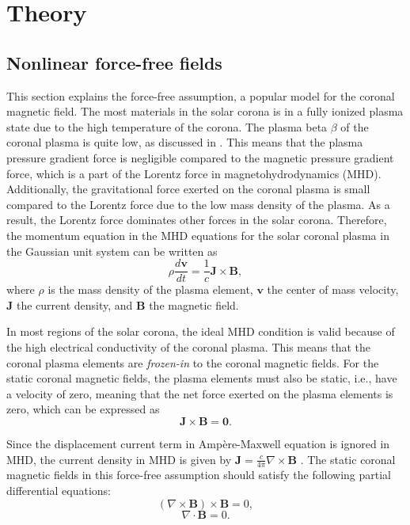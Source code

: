 
\section{Theory}

\subsection{Nonlinear force-free fields}\label{sec:nlfff}
This section explains the force-free assumption, a popular model for the coronal magnetic field. The most materials in the solar corona is in a fully ionized plasma state due to the high temperature of the corona. The plasma beta $\beta$ of the coronal plasma is quite low, as discussed in \parencite{gary2001plasma}. This means that the plasma pressure gradient force is negligible compared to the magnetic pressure gradient force, which is a part of the Lorentz force in magnetohydrodynamics (MHD). Additionally, the gravitational force exerted on the coronal plasma is small compared to the Lorentz force due to the low mass density of the plasma. As a result, the Lorentz force dominates other forces in the solar corona. Therefore, the momentum equation in the MHD equations for the solar coronal plasma in the Gaussian unit system can be written as
\begin{equation*}
    \rho \frac{d\boldsymbol{v}}{dt} = \frac{1}{c}\mathbf{J}\times\mathbf{B},
\end{equation*}
where $\rho$ is the mass density of the plasma element, $\boldsymbol{v}$ the center of mass velocity, $\mathbf{J}$ the current density, and $\mathbf{B}$ the magnetic field. 

In most regions of the solar corona, the ideal MHD condition is valid because of the high electrical conductivity of the coronal plasma. This means that the coronal plasma elements are \emph{frozen-in} to the coronal magnetic fields. For the static coronal magnetic fields, the plasma elements must also be static, i.e., have a velocity of zero, meaning that the net force exerted on the plasma elements is zero, which can be expressed as
\begin{equation*}
    \mathbf{J}\times\mathbf{B} = \mathbf{0}.
\end{equation*}

Since the displacement current term in Amp\`ere-Maxwell equation is ignored in MHD, the current density in MHD is given by $\mathbf{J} = \frac{c}{4\pi} \nabla \times \mathbf{B}$ . The static coronal magnetic fields in this force-free assumption should satisfy the following partial differential equations:
\begin{equation}\label{eq:ff}
    (\nabla \times \mathbf{B})\times\mathbf{B} = 0,
\end{equation}
\begin{equation}\label{eq:div}
    \nabla \cdot \mathbf{B} = 0.
\end{equation}

